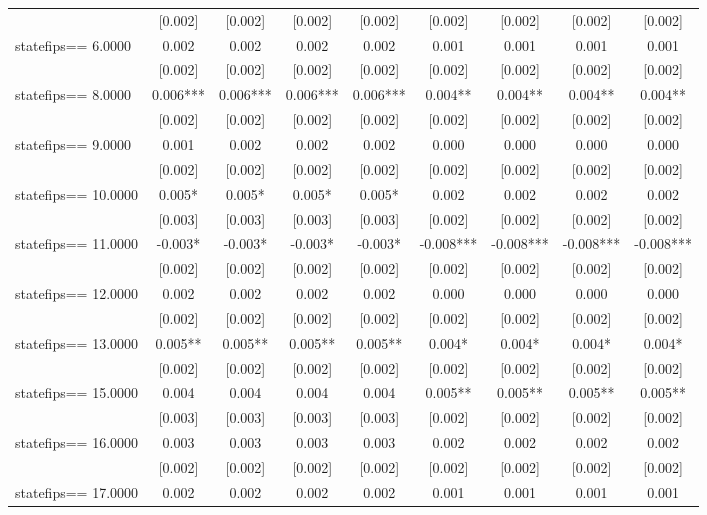 \documentclass[]{article}
\begin{document}
\begin{tabular}{lcccccccc}
 & [0.002] & [0.002] & [0.002] & [0.002] & [0.002] & [0.002] & [0.002] & [0.002] \\
statefips==     6.0000 & 0.002 & 0.002 & 0.002 & 0.002 & 0.001 & 0.001 & 0.001 & 0.001 \\
 & [0.002] & [0.002] & [0.002] & [0.002] & [0.002] & [0.002] & [0.002] & [0.002] \\
statefips==     8.0000 & 0.006*** & 0.006*** & 0.006*** & 0.006*** & 0.004** & 0.004** & 0.004** & 0.004** \\
 & [0.002] & [0.002] & [0.002] & [0.002] & [0.002] & [0.002] & [0.002] & [0.002] \\
statefips==     9.0000 & 0.001 & 0.002 & 0.002 & 0.002 & 0.000 & 0.000 & 0.000 & 0.000 \\
 & [0.002] & [0.002] & [0.002] & [0.002] & [0.002] & [0.002] & [0.002] & [0.002] \\
statefips==    10.0000 & 0.005* & 0.005* & 0.005* & 0.005* & 0.002 & 0.002 & 0.002 & 0.002 \\
 & [0.003] & [0.003] & [0.003] & [0.003] & [0.002] & [0.002] & [0.002] & [0.002] \\
statefips==    11.0000 & -0.003* & -0.003* & -0.003* & -0.003* & -0.008*** & -0.008*** & -0.008*** & -0.008*** \\
 & [0.002] & [0.002] & [0.002] & [0.002] & [0.002] & [0.002] & [0.002] & [0.002] \\
statefips==    12.0000 & 0.002 & 0.002 & 0.002 & 0.002 & 0.000 & 0.000 & 0.000 & 0.000 \\
 & [0.002] & [0.002] & [0.002] & [0.002] & [0.002] & [0.002] & [0.002] & [0.002] \\
statefips==    13.0000 & 0.005** & 0.005** & 0.005** & 0.005** & 0.004* & 0.004* & 0.004* & 0.004* \\
 & [0.002] & [0.002] & [0.002] & [0.002] & [0.002] & [0.002] & [0.002] & [0.002] \\
statefips==    15.0000 & 0.004 & 0.004 & 0.004 & 0.004 & 0.005** & 0.005** & 0.005** & 0.005** \\
 & [0.003] & [0.003] & [0.003] & [0.003] & [0.002] & [0.002] & [0.002] & [0.002] \\
statefips==    16.0000 & 0.003 & 0.003 & 0.003 & 0.003 & 0.002 & 0.002 & 0.002 & 0.002 \\
 & [0.002] & [0.002] & [0.002] & [0.002] & [0.002] & [0.002] & [0.002] & [0.002] \\
statefips==    17.0000 & 0.002 & 0.002 & 0.002 & 0.002 & 0.001 & 0.001 & 0.001 & 0.001 \\

\end{tabular}
\end{document}
